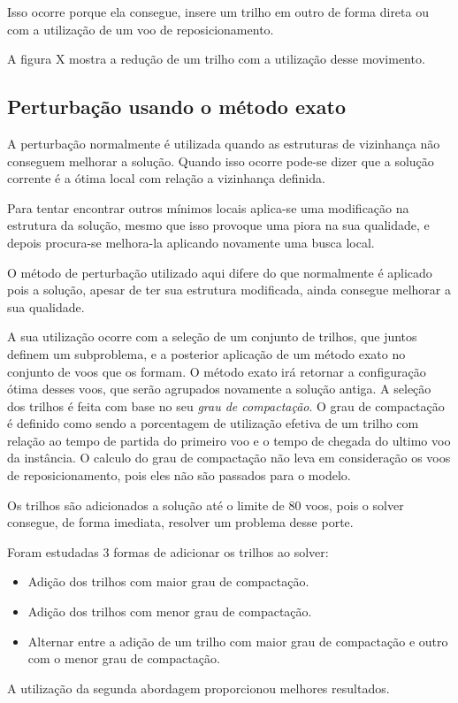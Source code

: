 Isso ocorre porque ela consegue, insere um trilho em outro de forma direta ou
com a utilização de um voo de reposicionamento.
 
A figura X mostra a redução de um trilho com a utilização desse movimento.
 
 \subsection{Perturbação usando o método exato}
   
A perturbação normalmente é utilizada quando as estruturas de vizinhança não
conseguem melhorar a solução. Quando isso ocorre pode-se dizer que a solução
corrente é a ótima local com relação a vizinhança definida.
 
Para tentar encontrar outros mínimos locais aplica-se uma modificação na
estrutura da solução, mesmo que isso provoque uma piora na sua qualidade, e
depois procura-se melhora-la aplicando novamente uma busca local.
 
O método de perturbação utilizado aqui difere do que normalmente é aplicado
pois a solução, apesar de ter sua estrutura modificada, ainda consegue melhorar
a sua qualidade.
 
A sua utilização ocorre com a seleção de um conjunto de trilhos, que juntos
definem um subproblema, e a posterior aplicação de um método exato no conjunto
de voos que os formam. O método exato irá retornar a configuração ótima desses
voos, que serão agrupados novamente a solução antiga. A seleção dos trilhos é
feita com base no seu \textit{grau de compactação}. O grau de compactação é
definido como sendo a porcentagem de utilização efetiva de um trilho com
relação ao tempo de partida do primeiro voo e o tempo de chegada do ultimo voo
da instância. O calculo do grau de compactação não leva em consideração os voos
de reposicionamento, pois eles não são passados para o modelo.
 
Os trilhos são adicionados a solução até o limite de 80 voos, pois o solver
consegue, de forma imediata, resolver um problema desse porte.
	
Foram estudadas 3 formas de adicionar os trilhos ao solver:
	
	\begin{itemize}
\item Adição dos trilhos com maior grau de compactação.
\item Adição dos trilhos com menor grau de compactação.
\item Alternar entre a adição de um trilho com maior grau de compactação e outro com o menor grau de compactação.
\end{itemize}
 
 A utilização da segunda abordagem proporcionou melhores resultados.
 
 